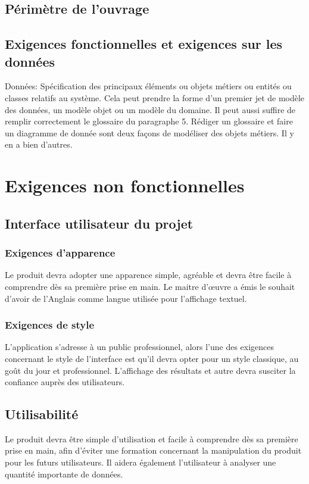 		\subsection{Périmètre de l'ouvrage}

		\subsection{Exigences fonctionnelles et exigences sur les données}	
		{\color{red}
		Données: Spécification des principaux éléments ou objets métiers ou entités ou classes relatifs au système. Cela peut prendre la forme d’un premier jet de modèle des données, un modèle objet ou un modèle du domaine. Il peut aussi suffire de remplir correctement le glossaire du paragraphe 5. Rédiger un glossaire et faire un diagramme de donnée sont deux façons de modéliser des objets métiers. Il y en a bien d’autres.\\
		}
	
	\section{Exigences non fonctionnelles}
		\subsection{Interface utilisateur du projet}
		
		\subsubsection{Exigences d’apparence} 
		Le produit devra adopter une apparence simple, agréable et devra être facile à comprendre dès sa première prise en main.
		Le maitre d’œuvre a émis le souhait d’avoir de l’Anglais comme langue utilisée pour l’affichage textuel.

		\subsubsection{Exigences de style}
		L’application s’adresse à un public professionnel, alors l’une des exigences concernant le style de l’interface est qu’il devra opter pour un style classique, au goût du jour et professionnel. L’affichage des résultats et autre devra susciter la confiance auprès des utilisateurs.

		\subsection{Utilisabilité}
		Le produit devra être simple d’utilisation et facile à comprendre dès sa première prise en main, afin d’éviter une formation concernant la manipulation du produit pour les futurs utilisateurs.
		Il aidera également l’utilisateur à analyser une quantité importante de données.

